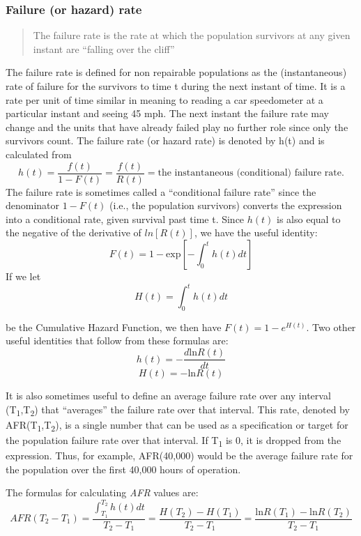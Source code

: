 \documentclass[]{book}
\theoremstyle{definition}
\theoremstyle{definition}
\theoremstyle{definition}
\theoremstyle{remark}
\begin{document}
\subsubsection{Failure (or hazard) rate}\label{failure-or-hazard-rate}

\begin{quote}
The failure rate is the rate at which the population survivors at any
given instant are ``falling over the cliff''
\end{quote}

The failure rate is defined for non repairable populations as the
(instantaneous) rate of failure for the survivors to time t during the
next instant of time. It is a rate per unit of time similar in meaning
to reading a car speedometer at a particular instant and seeing 45 mph.
The next instant the failure rate may change and the units that have
already failed play no further role since only the survivors count. The
failure rate (or hazard rate) is denoted by h(t) and is calculated from
\[h(t) = \frac{f(t)}{1 - F(t)} = \frac{f(t)}{R(t)} = \mbox{the instantaneous (conditional) failure rate.}\]
The failure rate is sometimes called a ``conditional failure rate''
since the denominator \(1−F(t)\) (i.e., the population survivors)
converts the expression into a conditional rate, given survival past
time t. Since \(h(t)\) is also equal to the negative of the derivative
of \(ln[R(t)]\), we have the useful identity:
\[F(t)=1-\mbox{exp}\left[-\int_0^t h(t)dt\right]\] If we let
\[H(t) = \int_0^t h(t)dt\]

be the Cumulative Hazard Function, we then have \(F(t)=1−e^{H(t)}\). Two
other useful identities that follow from these formulas are:
\[h(t) = - \frac{d \mbox{ln} R(t)}{dt}\] \[H(t) = - \mbox{ln} R(t)\]

It is also sometimes useful to define an average failure rate over any
interval (T\textsubscript{1},T\textsubscript{2}) that ``averages'' the
failure rate over that interval. This rate, denoted by
AFR(T\textsubscript{1},T\textsubscript{2}), is a single number that can
be used as a specification or target for the population failure rate
over that interval. If T\textsubscript{1} is 0, it is dropped from the
expression. Thus, for example, AFR(40,000) would be the average failure
rate for the population over the first 40,000 hours of operation.

The formulas for calculating \emph{AFR} values are:
\[AFR(T_2 - T_1) = \frac{\int_{T_1}^{T_2} h(t)dt}{T_2 - T_1} = \frac{H(T_2) - H(T_1)}{T_2 - T_1} = \frac{\mbox{ln}R(T_1) - \mbox{ln}R(T_2)}{T_2 - T_1}\]
\end{document}
